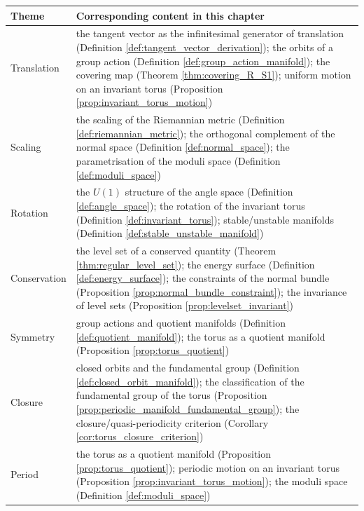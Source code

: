 \begin{center}
\renewcommand{\arraystretch}{1.3}
\begin{tabular}{>{\raggedright\arraybackslash}p{2.8cm}>{\raggedright\arraybackslash}p{9.9cm}}
\toprule
Theme & Corresponding content in this chapter \\
\midrule
Translation & the tangent vector as the infinitesimal generator of translation (Definition \ref{def:tangent_vector_derivation}); the orbits of a group action (Definition \ref{def:group_action_manifold}); the covering map (Theorem \ref{thm:covering_R_S1}); uniform motion on an invariant torus (Proposition \ref{prop:invariant_torus_motion}) \\
Scaling & the scaling of the Riemannian metric (Definition \ref{def:riemannian_metric}); the orthogonal complement of the normal space (Definition \ref{def:normal_space}); the parametrisation of the moduli space (Definition \ref{def:moduli_space}) \\
Rotation & the $U(1)$ structure of the angle space (Definition \ref{def:angle_space}); the rotation of the invariant torus (Definition \ref{def:invariant_torus}); stable/unstable manifolds (Definition \ref{def:stable_unstable_manifold}) \\
Conservation & the level set of a conserved quantity (Theorem \ref{thm:regular_level_set}); the energy surface (Definition \ref{def:energy_surface}); the constraints of the normal bundle (Proposition \ref{prop:normal_bundle_constraint}); the invariance of level sets (Proposition \ref{prop:levelset_invariant}) \\
Symmetry & group actions and quotient manifolds (Definition \ref{def:quotient_manifold}); the torus as a quotient manifold (Proposition \ref{prop:torus_quotient}) \\
Closure & closed orbits and the fundamental group (Definition \ref{def:closed_orbit_manifold}); the classification of the fundamental group of the torus (Proposition \ref{prop:periodic_manifold_fundamental_group}); the closure/quasi-periodicity criterion (Corollary \ref{cor:torus_closure_criterion}) \\
Period & the torus as a quotient manifold (Proposition \ref{prop:torus_quotient}); periodic motion on an invariant torus (Proposition \ref{prop:invariant_torus_motion}); the moduli space (Definition \ref{def:moduli_space}) \\
\bottomrule
\end{tabular}
\end{center}

